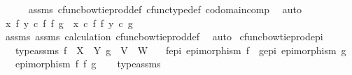 \begin{isabellebody}
\ \ \ \ \isamarkupfalse%
\ assms\ cfunc{\isacharunderscore}{\kern0pt}bowtie{\isacharunderscore}{\kern0pt}prod{\isacharunderscore}{\kern0pt}def\ cfunc{\isacharunderscore}{\kern0pt}type{\isacharunderscore}{\kern0pt}def\ codomain{\isacharunderscore}{\kern0pt}comp\ \isamarkupfalse%
\ auto\isanewline
\ \ \isamarkupfalse%
\ \isamarkupfalse%
\ {\isachardoublequoteopen}{\isacharparenleft}{\kern0pt}x\ {\isasymbowtie}\isactrlsub f\ y{\isacharparenright}{\kern0pt}\ {\isasymcirc}\isactrlsub c\ {\isacharparenleft}{\kern0pt}f\ {\isasymbowtie}\isactrlsub f\ g{\isacharparenright}{\kern0pt}\ {\isacharequal}{\kern0pt}\ {\isacharparenleft}{\kern0pt}x\ {\isasymcirc}\isactrlsub c\ f{\isacharparenright}{\kern0pt}\ {\isasymbowtie}\isactrlsub f\ {\isacharparenleft}{\kern0pt}y\ {\isasymcirc}\isactrlsub c\ g{\isacharparenright}{\kern0pt}{\isachardoublequoteclose}\isanewline
\ \ \ \ \isamarkupfalse%
\ assms{\isacharparenleft}{\kern0pt}{}{\isacharparenright}{\kern0pt}\ assms{\isacharparenleft}{\kern0pt}{}{\isacharparenright}{\kern0pt}\ calculation\ cfunc{\isacharunderscore}{\kern0pt}bowtie{\isacharunderscore}{\kern0pt}prod{\isacharunderscore}{\kern0pt}def{}\ \isamarkupfalse%
\ auto\isanewline
{}\isamarkupfalse%
%
\endisatagproof
{\isafoldproof}%
%
\isadelimproof
\isanewline
%
\endisadelimproof
\isanewline
{}\isamarkupfalse%
\ cfunc{\isacharunderscore}{\kern0pt}bowtieprod{\isacharunderscore}{\kern0pt}epi{\isacharcolon}{\kern0pt}\isanewline
\ \ \ type{\isacharunderscore}{\kern0pt}assms{\isacharcolon}{\kern0pt}\ {\isachardoublequoteopen}f\ {\isacharcolon}{\kern0pt}\ X\ {\isasymrightarrow}\ Y{\isachardoublequoteclose}\ {\isachardoublequoteopen}g\ {\isacharcolon}{\kern0pt}\ V\ {\isasymrightarrow}\ W{\isachardoublequoteclose}\isanewline
\ \ \ f{\isacharunderscore}{\kern0pt}epi{\isacharcolon}{\kern0pt}\ {\isachardoublequoteopen}epimorphism\ f{\isachardoublequoteclose}\ \ g{\isacharunderscore}{\kern0pt}epi{\isacharcolon}{\kern0pt}\ {\isachardoublequoteopen}epimorphism\ g{\isachardoublequoteclose}\isanewline
\ \ \ {\isachardoublequoteopen}epimorphism\ {\isacharparenleft}{\kern0pt}f\ {\isasymbowtie}\isactrlsub f\ g{\isacharparenright}{\kern0pt}{\isachardoublequoteclose}\isanewline
%
\isadelimproof
\ \ %
\endisadelimproof
%
\isatagproof
{}\isamarkupfalse%
\ type{\isacharunderscore}{\kern0pt}assms\isanewline
{}\isamarkupfalse%

\end{isabellebody}

